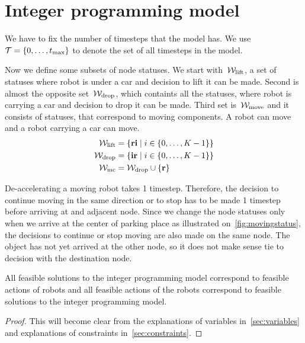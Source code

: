 \section{Integer programming model}
We have to fix the number of timesteps that the model has. We use $\mathcal{T} =
\{0,\ldots,t_{\max}\}$ to denote the set of all timesteps in the model.

Now we define some subsets of node statuses. We start with~$\mathcal{W}_\mathrm{lift}$, a set of
statuses where robot is under a car and decision to lift it can be made. Second
is almost the opposite set~$\mathcal{W}_\mathrm{drop}$, which containts all the statuses, where robot
is carrying a car and decision to drop it can be made. Third set is~$\mathcal{W}_\mathrm{move}$ and
it consists of statuses, that correspond to moving components. A robot can
move and a robot carrying a car can move.
\begin{align}
    \mathcal{W}_\mathrm{lift} &= \{\text{\bf ri} \mid i \in \{0,\ldots,K-1\}\}\\
    \mathcal{W}_\mathrm{drop} &= \{\text{\bf ir} \mid i \in \{0,\ldots,K-1\}\}\\
    \mathcal{W}_\mathrm{mc} &= \mathcal{W}_\mathrm{drop} \cup \{\text{\bf r}\}
\end{align}

De-accelerating a moving robot takes 1 timestep. Therefore, the decision to continue
moving in the same direction or to stop has to be made 1 timestep before
arriving at and adjacent node. Since we change the node statuses only when we
arrive at the center of parking place as illustrated
on~\autoref{fig:movingstatus}, the decisions to continue or stop moving are
also made on the same node. The object has not yet arrived at the other node,
so it does not make sense tie to decision with the destination node.

\begin{lemma}
    All feasible solutions to the integer programming model correspond to feasible
    actions of robots and all feasible actions of the robots correspond to
    feasible solutions to the integer programming model.
\end{lemma}
\begin{proof}
    This will become clear from the explanations of variables
    in~\autoref{sec:variables} and explanations of constraints
    in~\autoref{sec:constraints}.
\end{proof}
